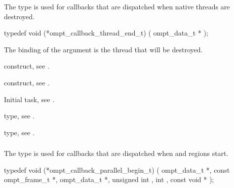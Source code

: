 \summary
The  type is used for callbacks 
that are dispatched when native threads are destroyed.

\format
\begin{ccppspecific}
\begin{omptCallback}
typedef void (*ompt_callback_thread_end_t) (
  ompt_data_t *
);
\end{omptCallback}
\end{ccppspecific}

\argdesc
The binding of the  argument is the thread that will be destroyed.

\begin{crossrefs}
\item {} construct, see .

\item {} construct, see .

\item Initial task, see .

\item {} type, see .

\item {} type, see .
\end{crossrefs}



\subsubsection{}
\label{sec:ompt_callback_parallel_begin_t}

\summary
The  type is used for callbacks 
that are dispatched when  and  regions start.

\format
\begin{ccppspecific}
\begin{omptCallback}
typedef void (*ompt_callback_parallel_begin_t) (
  ompt_data_t *,
  const ompt_frame_t *,
  ompt_data_t *,
  unsigned int ,
  int ,
  const void *
);
\end{omptCallback}
\end{ccppspecific}

